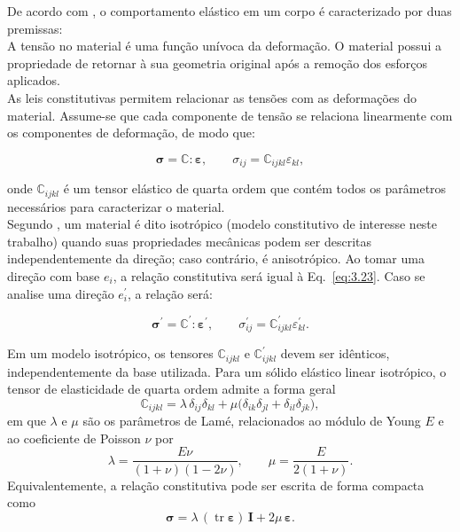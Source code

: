 \indent De acordo com \citet{continuummechanicsengineers2010}, o comportamento elástico em um corpo é caracterizado por duas premissas: \\
\indent A tensão no material é uma função unívoca da deformação. O material possui a propriedade de retornar à sua geometria original após a remoção dos esforços aplicados. \\
\indent As leis constitutivas permitem relacionar as tensões com as deformações do material. Assume-se que cada componente de tensão se relaciona linearmente com os componentes de deformação, de modo que: 

\begin{equation}
    \boldsymbol{\sigma} = \mathbb{C} : \boldsymbol{\varepsilon}, \qquad \sigma_{ij} = \mathbb{C}_{ijkl} \varepsilon_{kl},
    \label{eq:3.23}
\end{equation}

\noindent onde $\mathbb{C}_{ijkl}$ é um tensor elástico de quarta ordem que contém todos os parâmetros necessários para caracterizar o material. \\
\indent Segundo \citet{introductioncontinuummechanics2013}, um material é dito isotrópico (modelo constitutivo de interesse neste trabalho) quando suas propriedades mecânicas podem ser descritas independentemente da direção; caso contrário, é anisotrópico. Ao tomar uma direção com base $e_i$, a relação constitutiva será igual à Eq.~\ref{eq:3.23}. Caso se analise uma direção $e_i^\prime$, a relação será: 

\begin{equation}
    \boldsymbol{\sigma}^\prime = \mathbb{C}^\prime : \boldsymbol{\varepsilon}^\prime, \qquad \sigma_{ij}^\prime = \mathbb{C}_{ijkl}^\prime \varepsilon_{kl}^\prime.
    \label{eq:3.24}
\end{equation}

\indent Em um modelo isotrópico, os tensores $\mathbb{C}_{ijkl}$ e $\mathbb{C}_{ijkl}^\prime$ devem ser idênticos, independentemente da base utilizada. Para um sólido elástico linear isotrópico, o tensor de elasticidade de quarta ordem admite a forma geral
\begin{equation}
    \mathbb{C}_{ijkl} = \lambda\,\delta_{ij}\delta_{kl} + \mu\bigl(\delta_{ik}\delta_{jl} + \delta_{il}\delta_{jk}\bigr),
    \label{eq:3.25}
\end{equation}
\noindent em que \(\lambda\) e \(\mu\) são os parâmetros de Lamé, relacionados ao módulo de Young \(E\) e ao coeficiente de Poisson \(\nu\) por
\begin{equation}
    \lambda = \frac{E\nu}{(1+\nu)(1-2\nu)}, \qquad
    \mu = \frac{E}{2(1+\nu)}.
    \label{eq:3.26}
\end{equation}
\noindent Equivalentemente, a relação constitutiva pode ser escrita de forma compacta como
\begin{equation}
    \boldsymbol{\sigma} = \lambda\,(\operatorname{tr}\boldsymbol{\varepsilon})\,\mathbf{I} + 2\mu\,\boldsymbol{\varepsilon}.
    \label{eq:3.27}
\end{equation}

